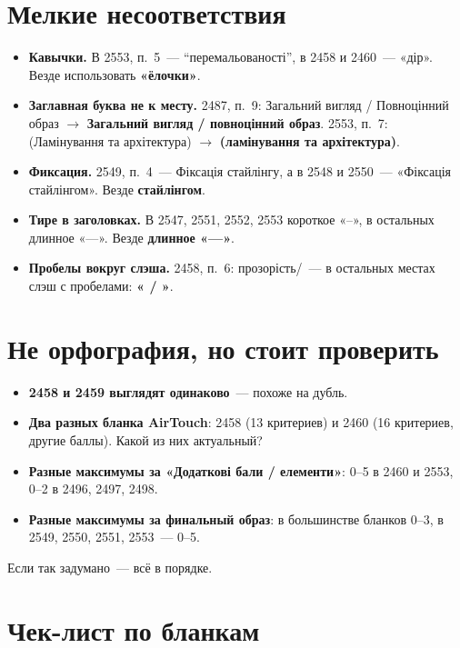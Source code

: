 \documentclass[11pt,a4paper]{article}
\newcommand{\was}[1]{\textcolor{bad}{#1}}
\newcommand{\now}[1]{\textcolor{good}{\textbf{#1}}}
\begin{document}
\section{Мелкие несоответствия}

\begin{itemize}[leftmargin=*,itemsep=3pt]
  \item \textbf{Кавычки.} В 2553, п.~5~— \was{“перемальованості”}, в 2458 и 2460~— «дір». Везде использовать \now{«ёлочки»}.
  \item \textbf{Заглавная буква не к месту.}
    2487, п.~9: \was{Загальний вигляд / Повноцінний образ} $\to$ \now{Загальний вигляд / повноцінний образ}.
    2553, п.~7: \was{(Ламінування та архітектура)} $\to$ \now{(ламінування та архітектура)}.
  \item \textbf{Фиксация.} 2549, п.~4~— \was{Фіксація стайлінгу}, а в 2548 и 2550~— «Фіксація стайлінгом». Везде \now{стайлінгом}.
  \item \textbf{Тире в заголовках.} В 2547, 2551, 2552, 2553 короткое «–», в остальных длинное «—». Везде \now{длинное «—»}.
  \item \textbf{Пробелы вокруг слэша.} 2458, п.~6: \was{прозорість/}~— в остальных местах слэш с пробелами: \now{« / »}.
\end{itemize}

\section{Не орфография, но стоит проверить}

\begin{itemize}[leftmargin=*,itemsep=3pt]
  \item \textbf{2458 и 2459 выглядят одинаково}~— похоже на дубль.
  \item \textbf{Два разных бланка AirTouch}: 2458 (13 критериев) и 2460 (16 критериев, другие баллы). Какой из них актуальный?
  \item \textbf{Разные максимумы за «Додаткові бали / елементи»}: 0–5 в 2460 и 2553, 0–2 в 2496, 2497, 2498.
  \item \textbf{Разные максимумы за финальный образ}: в большинстве бланков 0–3, в 2549, 2550, 2551, 2553~— 0–5.
\end{itemize}
Если так задумано~— всё в порядке.

\section{Чек-лист по бланкам}
\end{document}
